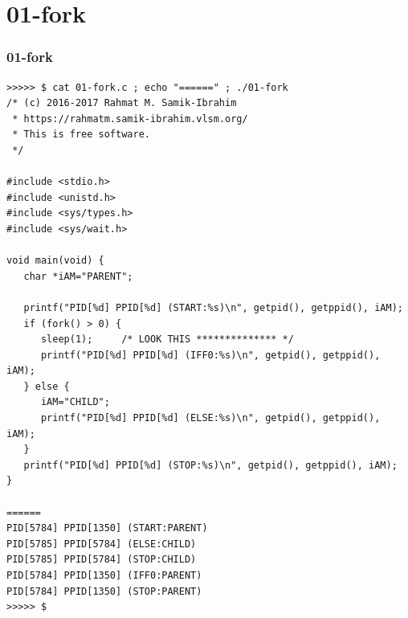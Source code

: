 \documentclass[xcolor=table, notheorems, hyperref={pdfpagelabels=false}]{beamer}
\begin{document}
\section{01-fork}
\begin{frame}[fragile]
\frametitle{01-fork}
\begin{lstlisting}[basicstyle=\ttfamily\tiny]
>>>>> $ cat 01-fork.c ; echo "======" ; ./01-fork 
/* (c) 2016-2017 Rahmat M. Samik-Ibrahim
 * https://rahmatm.samik-ibrahim.vlsm.org/
 * This is free software.
 */

#include <stdio.h>
#include <unistd.h>
#include <sys/types.h>
#include <sys/wait.h>

void main(void) {
   char *iAM="PARENT";
  
   printf("PID[%d] PPID[%d] (START:%s)\n", getpid(), getppid(), iAM);
   if (fork() > 0) {
      sleep(1);     /* LOOK THIS ************** */
      printf("PID[%d] PPID[%d] (IFF0:%s)\n", getpid(), getppid(), iAM);
   } else {
      iAM="CHILD";
      printf("PID[%d] PPID[%d] (ELSE:%s)\n", getpid(), getppid(), iAM);
   }
   printf("PID[%d] PPID[%d] (STOP:%s)\n", getpid(), getppid(), iAM);
}

======
PID[5784] PPID[1350] (START:PARENT)
PID[5785] PPID[5784] (ELSE:CHILD)
PID[5785] PPID[5784] (STOP:CHILD)
PID[5784] PPID[1350] (IFF0:PARENT)
PID[5784] PPID[1350] (STOP:PARENT)
>>>>> $ 

\end{lstlisting}
\end{frame}

\end{document}
